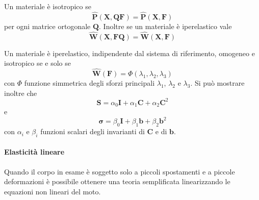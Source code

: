 Un materiale è isotropico se
$$\widehat{\mathbf{P}}(\mathbf{X},\mathbf{Q}\mathbf{F}) = \widehat{\mathbf{P}}(\mathbf{X},\mathbf{F}) $$
per ogni matrice ortogonale $\mathbf{Q}$.
Inoltre se un materiale è iperelastico vale 
$$\widehat{\mathbf{W}}(\mathbf{X},\mathbf{F}\mathbf{Q}) = \widehat{\mathbf{W}}(\mathbf{X},\mathbf{F}) $$

Un materiale è iperelastico, indipendente dal sistema di riferimento, omogeneo e isotropico se e solo se
$$\widehat{\mathbf{W}}(\mathbf{F}) = \Phi(\lambda_1,\lambda_2,\lambda_3) $$
con $\Phi$ funzione simmetrica degli sforzi principali $\lambda_1$, $\lambda_2$ e $\lambda_3$.
Si può mostrare inoltre che
$$\mathbf{S}=\alpha_0\mathbf{I}+\alpha_1\mathbf{C}+\alpha_2\mathbf{C}^2 $$
e
$$\boldsymbol{\sigma}=\beta_0\mathbf{I}+\beta_1\mathbf{b}+\beta_2\mathbf{b}^2 $$
con $\alpha_i$ e $\beta_i$ funzioni scalari degli invarianti di $\mathbf{C}$  e di $\mathbf{b}$.
\paragraph{Elasticità lineare}
Quando il corpo in esame è soggetto solo a piccoli spostamenti e a piccole deformazioni è possibile ottenere una teoria semplificata linearizzando le equazioni non lineari del moto.

